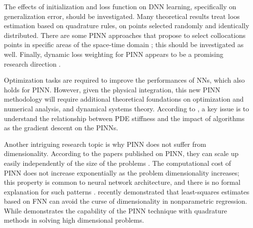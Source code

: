 \documentclass[pdflatex,sn-basic]{sn-jnl}%
\theoremstyle{thmstyleone}%
\theoremstyle{thmstyletwo}%
\theoremstyle{thmstylethree}%
\begin{document}
The effects of initialization and loss function on DNN learning, specifically on generalization error, should be investigated. 
Many theoretical results treat loos estimation based on quadrature rules, on points selected randomly and identically distributed.
There are some PINN approaches that propose to select collocations points in specific areas of the space-time domain \citep{Nab2021_EfficientTrainingPhysics_GlaNGM}; this should be investigated as well. 
Finally, dynamic loss weighting for PINN appears to be a promising research direction \citep{Nan2022_DevelopingDigitalTwins_HenNHN}. 



Optimization tasks are required to improve the performances of NNs, which also holds for PINN. However, given the physical integration, this new PINN methodology will require additional theoretical foundations on optimization and numerical analysis, and dynamical systems theory. 
According to \citep{Wan2021_UnderstandingMitigatingGradient_TenWTP, Wan2022_WhenWhyPinns_YuWYP}, a key issue is to understand the relationship between PDE stiffness and the impact of algorithms as the gradient descent on the  PINNs.


Another intriguing research topic is why PINN does not suffer from dimensionality.
According to the papers published on PINN, they can scale up easily independently of the size of the problems \citep{Mis2021_PhysicsInformedNeural_MolMM}.
The computational cost of PINN does not increase exponentially as the problem dimensionality increases; this property is common to neural network architecture, and there is no formal explanation for such patterns \citep{De2021_ErrorAnalysisPhysics_MisDRM}. 
%
\cite{Bau2019_DeepLearningAs_KohBK} recently demonstrated that least-squares estimates based on FNN can avoid the curse of dimensionality in nonparametric regression.
While \cite{Zub2021_NeuralpdeAutomatingPhysics_McCZMMa} demonstrates the capability of the PINN technique with quadrature methods in solving high dimensional problems.
\end{document}
